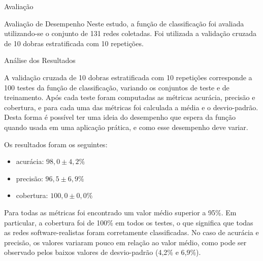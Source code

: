 \begin{section}{Avaliação}
\begin{subsection}{Avaliação de Desempenho}
	Neste estudo, a função de classificação foi avaliada utilizando-se o conjunto de 131 redes coletadas. Foi utilizada a validação cruzada de 10 dobras estratificada com 10 repetições.

	


\end{subsection}

\begin{subsection}{Análise dos Resultados}
	
	A validação cruzada de 10 dobras estratificada com 10 repetições corresponde a 100 testes da função de classificação, variando os conjuntos de teste e de treinamento. Após cada teste foram computadas as métricas acurácia, precisão e cobertura, e para cada uma das métricas foi calculada a média e o desvio-padrão. Desta forma é possível ter uma ideia do desempenho que espera da função quando usada em uma aplicação prática, e como esse desempenho deve variar.
	
	Os resultados foram os seguintes:
	
	\begin{itemize}
		\item acurácia:  $98,0 \pm 4,2\%$
		\item precisão:  $96,5 \pm 6,9\%$
		\item cobertura: $100,0 \pm 0,0\%$
	\end{itemize}
	
	Para todas as métricas foi encontrado um valor médio superior a 95\%. Em particular, a cobertura foi de 100\% em todos os testes, o que significa que todas as redes software-realistas foram corretamente classificadas. No caso de acurácia e precisão, os valores variaram pouco em relação ao valor médio, como pode ser observado pelos baixos valores de desvio-padrão (4,2\% e 6,9\%).
	

\end{subsection}
\end{section}
